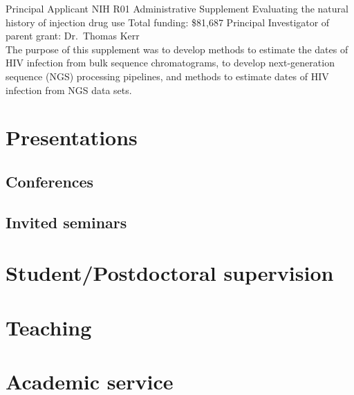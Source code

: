 \documentclass[11pt]{moderncv}
\begin{document}
{Principal Applicant}
{NIH R01 Administrative Supplement}
{Evaluating the natural history of injection drug use}
{Total funding: \$81,687}
{
Principal Investigator of parent grant: Dr.~Thomas Kerr\\
The purpose of this supplement was to develop methods to estimate the dates of HIV infection from bulk sequence chromatograms, to develop next-generation sequence (NGS) processing pipelines, and methods to estimate dates of HIV infection from NGS data sets.
}


\section {Presentations}

\subsection {Conferences}

\subsection {Invited seminars}




\section {Student/Postdoctoral supervision}


\section {Teaching}


\section {Academic service}
\end{document}

